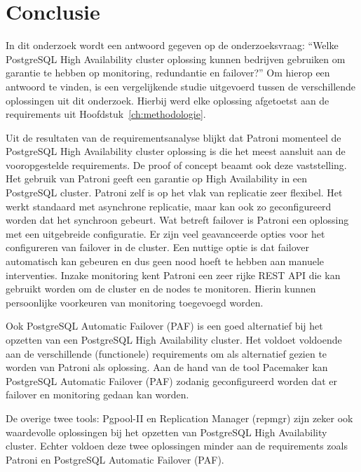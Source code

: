 
\chapter{Conclusie}
\label{ch:conclusie}

In dit onderzoek wordt een antwoord gegeven op de onderzoeksvraag: “Welke PostgreSQL High Availability cluster oplossing kunnen bedrijven gebruiken om garantie te hebben op monitoring, redundantie en failover?” Om hierop een antwoord te vinden, is een vergelijkende studie uitgevoerd tussen de verschillende oplossingen uit dit onderzoek. Hierbij werd elke oplossing afgetoetst aan de requirements uit Hoofdstuk~\ref{ch:methodologie}.

Uit de resultaten van de requirementsanalyse blijkt dat Patroni momenteel de PostgreSQL High Availability cluster oplossing is die het meest aansluit aan de vooropgestelde requirements. De proof of concept beaamt ook deze vaststelling. Het gebruik van Patroni geeft een garantie op High Availability in een PostgreSQL cluster. Patroni zelf is op het vlak van replicatie zeer flexibel. Het werkt standaard met asynchrone replicatie, maar kan ook zo geconfigureerd worden dat het synchroon gebeurt. Wat betreft failover is Patroni een oplossing met een uitgebreide configuratie. Er zijn veel geavanceerde opties voor het configureren van failover in de cluster. Een nuttige optie is dat failover automatisch kan gebeuren en dus geen nood hoeft te hebben aan manuele interventies. Inzake monitoring kent Patroni een zeer rijke REST API die kan gebruikt worden om de cluster en de nodes te monitoren. Hierin kunnen persoonlijke voorkeuren van monitoring toegevoegd worden.

Ook PostgreSQL Automatic Failover (PAF) is een goed alternatief bij het opzetten van een PostgreSQL High Availability cluster. Het voldoet voldoende aan de verschillende (functionele) requirements om als alternatief gezien te worden van Patroni als oplossing. Aan de hand van de tool Pacemaker kan PostgreSQL Automatic Failover (PAF) zodanig geconfigureerd worden dat er failover en monitoring gedaan kan worden.

De overige twee tools: Pgpool-II en Replication Manager (repmgr) zijn zeker ook waardevolle oplossingen bij het opzetten van PostgreSQL High Availability cluster. Echter voldoen deze twee oplossingen minder aan de requirements zoals Patroni en PostgreSQL Automatic Failover (PAF). 

